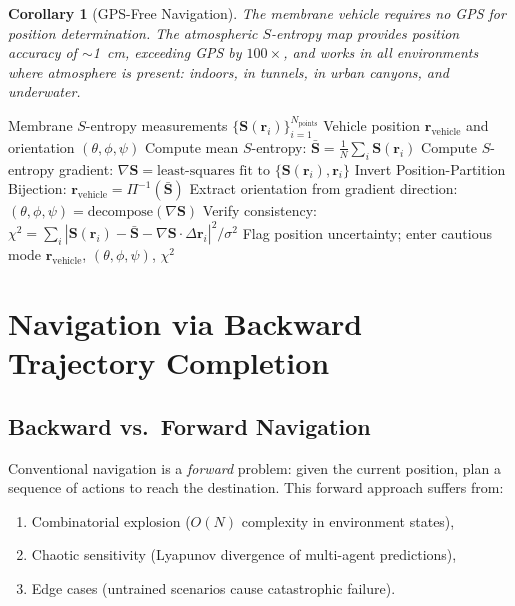 \documentclass[12pt]{article}
\newtheorem{corollary}[theorem]{Corollary}
\theoremstyle{definition}
\theoremstyle{remark}
\begin{document}
\begin{corollary}[GPS-Free Navigation]
\label{cor:gps_free}
The membrane vehicle requires no GPS for position determination. The atmospheric $S$-entropy map provides position accuracy of $\sim$\SI{1}{cm}, exceeding GPS by $100\times$, and works in all environments where atmosphere is present: indoors, in tunnels, in urban canyons, and underwater.
\end{corollary}

\begin{algorithm}[H]
\caption{Membrane Position Determination}
\label{alg:position}
\begin{algorithmic}[1]
\REQUIRE Membrane $S$-entropy measurements $\{\mathbf{S}(\mathbf{r}_i)\}_{i=1}^{N_{\mathrm{points}}}$
\ENSURE Vehicle position $\mathbf{r}_{\mathrm{vehicle}}$ and orientation $(\theta, \phi, \psi)$
\STATE Compute mean $S$-entropy: $\bar{\mathbf{S}} = \frac{1}{N} \sum_i \mathbf{S}(\mathbf{r}_i)$
\STATE Compute $S$-entropy gradient: $\nabla\mathbf{S} = \text{least-squares fit to } \{\mathbf{S}(\mathbf{r}_i), \mathbf{r}_i\}$
\STATE Invert Position-Partition Bijection: $\mathbf{r}_{\mathrm{vehicle}} = \Pi^{-1}(\bar{\mathbf{S}})$
\STATE Extract orientation from gradient direction: $(\theta, \phi, \psi) = \text{decompose}(\nabla\mathbf{S})$
\STATE Verify consistency: $\chi^2 = \sum_i |\mathbf{S}(\mathbf{r}_i) - \bar{\mathbf{S}} - \nabla\mathbf{S} \cdot \Delta\mathbf{r}_i|^2 / \sigma^2$
  \STATE Flag position uncertainty; enter cautious mode
\ENDIF
\RETURN $\mathbf{r}_{\mathrm{vehicle}}$, $(\theta, \phi, \psi)$, $\chi^2$
\end{algorithmic}
\end{algorithm}


\section{Navigation via Backward Trajectory Completion}
\label{sec:navigation}

\subsection{Backward vs.\ Forward Navigation}

Conventional navigation is a \emph{forward} problem: given the current position, plan a sequence of actions to reach the destination. This forward approach suffers from:
\begin{enumerate}[label=(\roman*)]
  \item Combinatorial explosion ($O(N)$ complexity in environment states),
  \item Chaotic sensitivity (Lyapunov divergence of multi-agent predictions),
  \item Edge cases (untrained scenarios cause catastrophic failure).
\end{enumerate}
\end{document}
